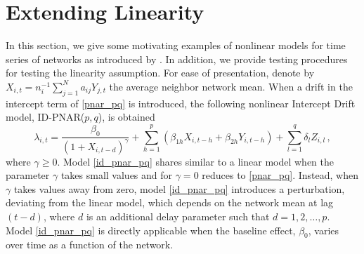 \section{Extending Linearity}
\label{sec:Linearity test}



In this section, we give  some motivating examples of nonlinear models for time series of networks as  introduced by \cite{armillotta_fokianos_2022_testing}. In addition, we provide testing procedures for testing the linearity assumption.
For ease of presentation, denote by $X_{i,t}=n_i^{-1}\sum_{j=1}^{N}a_{ij}Y_{j,t}$ the average neighbor network mean.
When a drift in the intercept term of \eqref{pnar_pq} is introduced, the following nonlinear Intercept Drift  model, ID-PNAR($p,q$), is obtained
\begin{equation}
	\lambda_{i,t}=\frac{\beta_0}{(1+X_{i,t-d})^{\gamma}}+\sum_{h=1}^{p}\left( \beta_{1h}X_{i,t-h}+\beta_{2h}Y_{i,t-h}\right) + \sum_{l=1}^{q}\delta_lZ_{i,l}\,,
	\label{id_pnar_pq}
\end{equation}
where $\gamma \geq 0$. Model \eqref{id_pnar_pq} shares similar to  a linear model when  the parameter $\gamma$ takes small values   and for $\gamma=0$ reduces  to  \eqref{pnar_pq}. Instead, when $\gamma$ takes values  away from zero, model \eqref{id_pnar_pq} introduces a perturbation, deviating from the linear model, which depends on the network mean at lag $(t-d)$, where $d$ is an additional delay  parameter  such that $d=1,2,\ldots,p$. Model \eqref{id_pnar_pq} is directly applicable  when the baseline effect, $\beta_0$, varies over time as a function of the network. 

